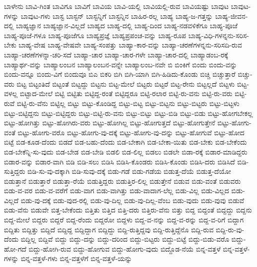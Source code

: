 {ಬಾಳೇನು
ಬಾವಿ-ಗಿಂತ
ಬಾವಿಗೂ
ಬಾವಿಗೆ
ಬಾವಿಯ
ಬಾವಿ-ಯಲ್ಲಿ
ಬಾವಿಯಲ್ಲಿ-ರುವ
ಬಾವಿಯಷ್ಟು
ಬಾವುಟ
ಬಾವುಟ-ಗಳನ್ನು
ಬಾವುಟ-ಗಳು
ಬಾಸ್ಟ
ಬಾಸ್ಟನ್
ಬಾಸ್ಟನ್ನಿಗೆ
ಬಾಸ್ಟನ್ನಿನ
ಬಾಹಿರ-ರಲ್ಲ
ಬಾಹ್ಯ
ಬಾಹ್ಯ-ಜ-ಗತ್ತನ್ನು
ಬಾಹ್ಯ-ಜೀವನ-ದಲ್ಲಿ
ಬಾಹ್ಯಜ್ಞಾನ
ಬಾಹ್ಯಜ್ಞಾನ-ವಿಲ್ಲದೆ
ಬಾಹ್ಯದ
ಬಾಹ್ಯ-ದಲ್ಲಿ
ಬಾಹ್ಯ-ದಿಂದ
ಬಾಹ್ಯ-ನಡವಳಿಕೆಗೂ
ಬಾಹ್ಯ-ಪೂಜೆ
ಬಾಹ್ಯ-ಪೂಜೆ-ಗಳೂ
ಬಾಹ್ಯ-ಪೂಜೆಗೂ
ಬಾಹ್ಯಪ್ರಜ್ಞೆ
ಬಾಹ್ಯಪ್ರಪಂಚ-ವನ್ನು
ಬಾಹ್ಯ-ರೂಪ
ಬಾಹ್ಯ-ವಿಧಿ-ಗಳನ್ನನು-ಸರಿಸ-ಬೇಕು
ಬಾಹ್ಯ-ವೇಷ
ಬಾಹ್ಯ-ವೇಷವೇ
ಬಾಹ್ಯ-ಸಂಪತ್ತು
ಬಾಹ್ಯಾ-ಕಾರ-ವನ್ನು
ಬಾಹ್ಯಾ-ಚರಣೆಗಳನ್ನನು-ಸರಿಸದಿ-ರುವ
ಬಾಹ್ಯಾ-ಚರಣೆಗಳನ್ನಾ-ಚರಿ-ಸದೆ
ಬಾಹ್ಯಾ-ಚಾರ
ಬಾಹ್ಯಾ-ಚಾರ-ಗಳೇ
ಬಾಹ್ಯಾ-ಚಾರ-ದಲ್ಲಿ
ಬಾಹ್ಯಾಡಂಬ-ರಕ್ಕೆ
ಬಾಹ್ಯಾರ್ಥ-ವನ್ನು
ಬಾಹ್ಯಾಲಂಬನ
ಬಾಹ್ಯಾಲಂಬನ-ವನ್ನೇ
ಬಾಹ್ಯಾಲಂಬ-ನವೇ
ಬಿ
ಬಿಂಕಿಗೆ
ಬಿಂದು
ಬಿಂದು-ವನ್ನು
ಬಿಂದು-ವನ್ನೂ
ಬಿಂದು-ವಿಗೆ
ಬಿಂದುವೂ
ಬಿಎ
ಬಿಕರಿ
ಬಿಗಿ
ಬಿಗಿ-ಯಾಗಿ
ಬಿಗಿ-ಹಿಡಿದು-ಕೊಂಡು
ಬಿಚ್ಚಿ
ಬಿಚ್ಚುತ್ತಾರೆ
ಬಿಚ್ಚು-ವರು
ಬಿಟ್ಟ
ಬಿಟ್ಟಂತಿದೆ
ಬಿಟ್ಟಂತೆ
ಬಿಟ್ಟದ್ದು
ಬಿಟ್ಟನು
ಬಿಟ್ಟ-ಮೇಲೆ
ಬಿಟ್ಟರು
ಬಿಟ್ಟರೆ
ಬಿಟ್ಟ-ರೇನು
ಬಿಟ್ಟಲ್ಲದೆ
ಬಿಟ್ಟಳು
ಬಿಟ್ಟ-ವಳಲ್ಲ
ಬಿಟ್ಟಾದ-ಮೇಲೆ
ಬಿಟ್ಟಿ
ಬಿಟ್ಟಿತು
ಬಿಟ್ಟಿದ್ದ-ರಂತೆ
ಬಿಟ್ಟಿದ್ದರೂ
ಬಿಟ್ಟಿ-ರಲಾರ
ಬಿಟ್ಟಿ-ರು-ವನು
ಬಿಟ್ಟಿ-ರು-ವರು
ಬಿಟ್ಟಿ-ರುವೆ
ಬಿಟ್ಟಿ-ರು-ವೆನು
ಬಿಟ್ಟಿಲ್ಲ
ಬಿಟ್ಟು
ಬಿಟ್ಟು-ಕೊಂಡಿದ್ದ
ಬಿಟ್ಟು-ಬಿಟ್ಟ
ಬಿಟ್ಟು-ಬಿಟ್ಟನು
ಬಿಟ್ಟು-ಬಿಟ್ಟರು
ಬಿಟ್ಟು-ಬಿಟ್ಟಳು
ಬಿಟ್ಟು-ಬಿಟ್ಟಿದ್ದನು
ಬಿಟ್ಟು-ಬಿಟ್ಟಿದ್ದರು
ಬಿಟ್ಟು-ಬಿಟ್ಟಿ-ರು-ವನು
ಬಿಟ್ಟು-ಬಿಟ್ಟು
ಬಿಟ್ಟು-ಬಿಡಿ
ಬಿಟ್ಟು-ಬಿಡು
ಬಿಟ್ಟು-ಹೋಗಬೇಕಲ್ಲ
ಬಿಟ್ಟು-ಹೋಗಿತ್ತು
ಬಿಟ್ಟು-ಹೋಗಿರು-ವರು
ಬಿಟ್ಟು-ಹೋಗಿಲ್ಲ
ಬಿಟ್ಟು-ಹೋಗುತ್ತದೆ
ಬಿಟ್ಟು-ಹೋಗುತ್ತೇನೆ
ಬಿಟ್ಟು-ಹೋಗು-ವಂತೆ
ಬಿಟ್ಟು-ಹೋಗು-ವರೊ
ಬಿಟ್ಟು-ಹೋಗು-ವು-ದಕ್ಕೆ
ಬಿಟ್ಟು-ಹೋಗು-ವು-ದನ್ನು
ಬಿಟ್ಟು-ಹೋಗುವೆ
ಬಿಟ್ಟು-ಹೋದ
ಬಿಟ್ಟೆ
ಬಿಡ-ಕೂಡ-ದೆಂದು
ಬಿಡದೆ
ಬಿಡ-ಬಹು-ದೆಂದು
ಬಿಡ-ಬೇಕಾಗಿ
ಬಿಡ-ಬೇಕಾ-ಯಿತು
ಬಿಡ-ಬೇಕು
ಬಿಡ-ಬೇಕೆಂದು
ಬಿಡ-ಬೇಕೆನ್ನಿ-ಸು-ವುದು
ಬಿಡ-ಬೇಡ
ಬಿಡ-ಬೇಡಿ
ಬಿಡಲಿ
ಬಿಡ-ಲಿಲ್ಲ
ಬಿಡಲು
ಬಿಡಲೇ
ಬಿಡಾ-ರಕ್ಕೆ
ಬಿಡಾರ-ಮಾಡಿದ್ದರು
ಬಿಡಾರ-ವನ್ನು
ಬಿಡಾರ-ವಾಗಿ
ಬಿಡಿ
ಬಿಡಿ-ಸಲು
ಬಿಡಿಸಿ
ಬಿಡಿಸಿ-ಕೊಂಡರು
ಬಿಡಿಸಿ-ಕೊಂಡು
ಬಿಡಿಸಿ-ದರು
ಬಿಡಿಸಿದೆ
ಬಿಡಿ-ಸುತ್ತಿದ್ದರು
ಬಿಡಿ-ಸು-ವು-ದಕ್ಕಾಗಿ
ಬಿಡಿ-ಸುವು-ದಕ್ಕೆ
ಬಿಡು-ಗಡೆ
ಬಿಡು-ಗಡೆಯ
ಬಿಡುತ್ತ-ದೆಯೆ
ಬಿಡುತ್ತ-ದೆಯೋ
ಬಿಡುತ್ತಾನೆ
ಬಿಡುತ್ತಾರೆ
ಬಿಡುತ್ತಾ-ರೆಯೆ
ಬಿಡುತ್ತಿದ್ದರು
ಬಿಡುತ್ತಿರ-ಲಿಲ್ಲ
ಬಿಡುತ್ತೇನೆ
ಬಿಡುವ
ಬಿಡು-ವಂತೆ
ಬಿಡುವರು
ಬಿಡು-ವ-ವರ
ಬಿಡು-ವ-ವರೆಗೆ
ಬಿಡು-ವಾಗ
ಬಿಡು-ವಾಗಿತ್ತು
ಬಿಡು-ವಾದಾಗ-ಲೆಲ್ಲ
ಬಿಡು-ವಿಲ್ಲ
ಬಿಡು-ವಿಲ್ಲದ
ಬಿಡು-ವಿಲ್ಲದೆ
ಬಿಡು-ವು-ದಕ್ಕೆ
ಬಿಡು-ವುದ-ರಲ್ಲಿ
ಬಿಡು-ವು-ದಿಲ್ಲ
ಬಿಡು-ವು-ದಿಲ್ಲ-ವೆಂಬ
ಬಿಡು-ವುದು
ಬಿಡು-ವುವು
ಬಿಡುವೆ
ಬಿಡು-ವೆನು
ಬಿಡುವೇ
ಬಿತ್ತ-ಬೇಕೆಂದು
ಬಿತ್ತಿತು
ಬಿತ್ತಿದ
ಬಿತ್ತಿ-ದರು
ಬಿತ್ತಿರು-ವೆನು
ಬಿತ್ತು
ಬಿದ್ದ
ಬಿದ್ದಂತೆ
ಬಿದ್ದದ್ದು
ಬಿದ್ದನು
ಬಿದ್ದ-ಮೇಲೆ
ಬಿದ್ದರು
ಬಿದ್ದರೆ
ಬಿದ್ದ-ರೆಂದು
ಬಿದ್ದರೋ
ಬಿದ್ದಳು
ಬಿದ್ದ-ವ-ನನ್ನು
ಬಿದ್ದ-ವ-ರನ್ನು
ಬಿದ್ದ-ವ-ರಿಗೆ
ಬಿದ್ದಾಗ
ಬಿದ್ದಿತು
ಬಿದ್ದಿತ್ತು
ಬಿದ್ದಿದೆ
ಬಿದ್ದಿದ್ದ
ಬಿದ್ದಿದ್ದಾಗ
ಬಿದ್ದಿದ್ದು
ಬಿದ್ದಿ-ರುತ್ತಿದ್ದವು
ಬಿದ್ದಿ-ರುತ್ತಿದ್ದೆನೊ
ಬಿದ್ದಿ-ರುವ
ಬಿದ್ದಿ-ರು-ವು-ದೆಂದು
ಬಿದ್ದಿಲ್ಲ
ಬಿದ್ದಿವೆ
ಬಿದ್ದು
ಬಿದ್ದು-ದನ್ನು
ಬಿದ್ದು-ದರಿಂದ
ಬಿದ್ದು-ಬಿಟ್ಟರು
ಬಿದ್ದು-ಬಿಟ್ಟೆ
ಬಿದ್ದು-ಬಿಡು-ವರೊ
ಬಿದ್ದು-ಹೋ-ಗದೆ
ಬಿದ್ದು-ಹೋಗಿ-ರುವ
ಬಿದ್ದು-ಹೋಗುವ
ಬಿದ್ದು-ಹೋಗು-ವುದು
ಬಿದ್ದೊಡ-ನೆಯೆ
ಬಿನ್ನ-ವತ್ತಳೆ
ಬಿನ್ನ-ವತ್ತಳೆ-ಗಳನ್ನು
ಬಿನ್ನ-ವತ್ತಳೆ-ಗಳು
ಬಿನ್ನ-ವತ್ತಳೆಗೆ
ಬಿನ್ನ-ವತ್ತಳೆ-ಯನ್ನು
}
